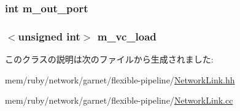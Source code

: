 \label{classNetworkLink_a6f69c0ff922be798fa1cfce69f83244e}
\hypertarget{classNetworkLink_a9b816056732f913b9f0558260b1d4410}{
\subsubsection[{m\_\-out\_\-port}]{\setlength{\rightskip}{0pt plus 5cm}int {\bf m\_\-out\_\-port}}}
\label{classNetworkLink_a9b816056732f913b9f0558260b1d4410}
\hypertarget{classNetworkLink_a929bb11421a47667a05e8e94e6d8ccd2}{
\subsubsection[{m\_\-vc\_\-load}]{$<$unsigned int$>$ {\bf m\_\-vc\_\-load}}}
\label{classNetworkLink_a929bb11421a47667a05e8e94e6d8ccd2}


このクラスの説明は次のファイルから生成されました:\begin{DoxyCompactItemize}
\item 
mem/ruby/network/garnet/flexible-\/pipeline/\hyperlink{NetworkLink_8hh}{NetworkLink.hh}\item 
mem/ruby/network/garnet/flexible-\/pipeline/\hyperlink{NetworkLink_8cc}{NetworkLink.cc}\end{DoxyCompactItemize}
